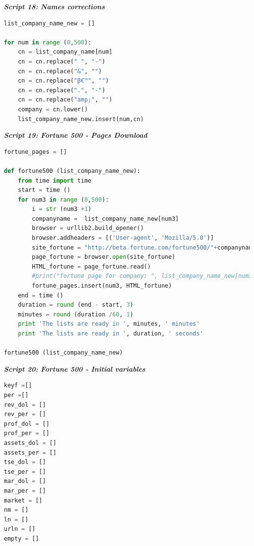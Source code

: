 \documentclass{book}
\begin{document}
\begin{center}
\textit{\textbf{Script 18: Names corrections}}\label{p18}
\end{center}
\begin{lstlisting}[language=Python]
list_company_name_new = []

for num in range (0,500):
    cn = list_company_name[num]
    cn = cn.replace(" ", "-")
    cn = cn.replace("&", "")
    cn = cn.replace("β€™", "")
    cn = cn.replace(".", "-")
    cn = cn.replace("amp;", "")    
    company = cn.lower()
    list_company_name_new.insert(num,cn)
\end{lstlisting}     

\begin{center}
\textit{\textbf{Script 19: Fortune 500 - Pages Download}}\label{p19}
\end{center}
\begin{lstlisting}[language=Python] 
fortune_pages = []

def fortune500 (list_company_name_new):
    from time import time  
    start = time ()
    for num3 in range (0,500):
        i = str (num3 +1)    
        companyname =  list_company_name_new[num3]
        browser = urllib2.build_opener() 
        browser.addheaders = [('User-agent', 'Mozilla/5.0')]
        site_fortune = "http://beta.fortune.com/fortune500/"+companyname+"-"+ i    
        page_fortune = browser.open(site_fortune)
        HTML_fortune = page_fortune.read()    
        #print("fortune page for company: ", list_company_name_new[num3],i)
        fortune_pages.insert(num3, HTML_fortune)
    end = time ()
    duration = round (end - start, 3)
    minutes = round (duration /60, 1)
    print 'The lists are ready in ', minutes, ' minutes'
    print 'The lists are ready in ', duration, ' seconds'

fortune500 (list_company_name_new)
\end{lstlisting}    

\begin{center}
\textit{\textbf{Script 20: Fortune 500 - Initial variables}}\label{p20}
\end{center}
\begin{lstlisting}[language=Python] 
keyf =[]
per =[]
rev_dol = []
rev_per = []
prof_dol = []
prof_per = []
assets_dol = []
assets_per = []
tse_dol = []
tse_per = []
mar_dol = []
mar_per = []
market = []
nm = []
ln = []
urln = []
empty = []
\end{lstlisting}  
\end{document}
